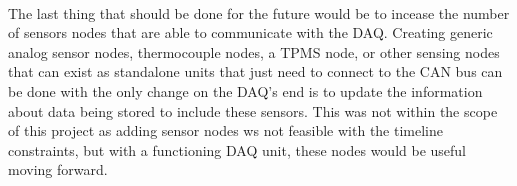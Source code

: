 \paragraph{}
The last thing that should be done for the future would be to incease the number of sensors nodes that are able to communicate with the DAQ.
Creating generic analog sensor nodes, thermocouple nodes, a TPMS node, or other sensing nodes that can exist as standalone units that just need to connect to the CAN bus can be done with the only change on the DAQ's end is to update the information about data being stored to include these sensors.
This was not within the scope of this project as adding sensor nodes ws not feasible with the timeline constraints, but with a functioning DAQ unit, these nodes would be useful moving forward.